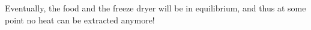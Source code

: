 Eventually, the food and the freeze dryer will be in equilibrium, and thus at some point no heat can be extracted anymore!